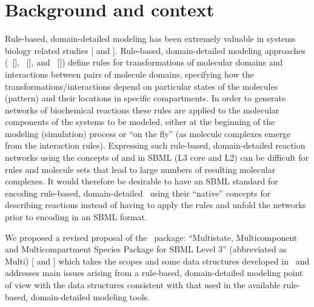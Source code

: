 
\section{Background and context}
\label{def:Background}

Rule-based, domain-detailed modeling has been extremely valuable in systems biology related studies [\cite{ref:nathan2015} and \cite{ref:jamesFader2013}]. Rule-based, domain-detailed modeling approaches (\BioNetGen\ [\cite{ref:bionetgen2009}], \Kappa\ [\cite{ref:kappa2004}], and \Simmune\ [\cite{ref:simmune2012, ref:simmune2006}]) define rules for \mBlockChangedBegin{\revTwentyTwentyMarch}transformations of molecular domains and \mBlockChangedEnd{\revTwentyTwentyMarch}interactions between pairs of molecule domains, specifying how the \mBlockChangedBegin{\revTwentyTwentyMarch}transformations/\mBlockChangedEnd{\revTwentyTwentyMarch}interactions depend on particular states of the molecules (pattern) and their locations in specific compartments. In order to generate networks of biochemical reactions these rules are applied to the molecular components of the systems to be modeled, either at the beginning of the modeling (simulation) process or ``on the fly'' (as molecule complexes emerge from the interaction rules). Expressing such rule-based, domain-detailed reaction networks using the concepts of \Species and \Compartment in SBML (L3 core and L2) can be difficult for rules and molecule sets that lead to large numbers of resulting molecular complexes. It would therefore be desirable to have an SBML standard for encoding rule-based, domain-detailed \smodels\ using their ``native'' concepts for describing reactions instead of having to apply the rules and unfold the networks prior to encoding in an SBML format.

We proposed a revised proposal of the \multi\ package: ``Multistate, Multicomponent and Multicompartment Species Package for SBML Level 3''  (abbreviated as Multi) [\cite{ref:revisedMulti} and \cite{ref:multiproposal280}] which takes the scopes and some data structures developed in \multiOneProposalWC\ and addresses main issues arising from a rule-based, domain-detailed modeling point of view with the data structures consistent with that used in the available rule-based, domain-detailed modeling tools. 

\label{def:OtherRuleBasedModels}


